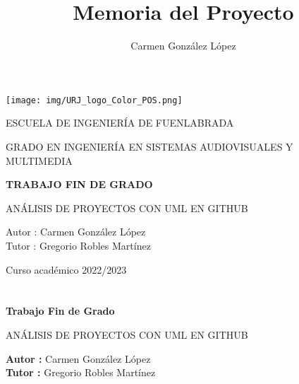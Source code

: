 \documentclass[a4paper, 12pt]{book}
\title{Memoria del Proyecto}
\author{Carmen González López}
\begin{document}
\renewcommand{\refname}{Bibliografía}  %
\renewcommand{\appendixname}{Apéndice}


\begin{titlepage}
\begin{center}
\texttt{[image: img/URJ\_logo\_Color\_POS.png]}

\vspace{1.75cm}

\LARGE
ESCUELA DE INGENIERÍA DE FUENLABRADA
\vspace{1cm}

\LARGE
GRADO EN INGENIERÍA EN SISTEMAS AUDIOVISUALES Y MULTIMEDIA

\vspace{1cm}
\LARGE
\textbf{TRABAJO FIN DE GRADO}

\vspace{2cm}

\Large
ANÁLISIS DE PROYECTOS CON UML EN GITHUB

\vspace{2cm}

\large
Autor : Carmen González López \\
Tutor : Gregorio Robles Martínez\\
\vspace{1cm}

\large
Curso académico 2022/2023

\end{center}
\end{titlepage}

\newpage
\mbox{}
\thispagestyle{empty} %


\clearpage
{}
\chapter*{}

\vspace{-4cm}
\begin{center}
\LARGE
\textbf{Trabajo Fin de Grado}

\vspace{1cm}
\large
ANÁLISIS DE PROYECTOS CON UML EN GITHUB

\vspace{1cm}
\large
\textbf{Autor :} Carmen González López\\
\textbf{Tutor :} Gregorio Robles Martínez

\end{center}
\end{document}
